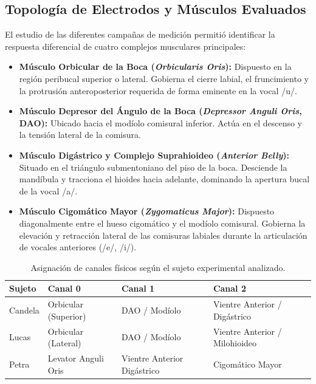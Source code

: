 \documentclass[11pt,a4paper]{article}
\begin{document}
\subsection{Topología de Electrodos y Músculos Evaluados}
\label{subsec:topologia_muscular}

El estudio de las diferentes campañas de medición permitió identificar la respuesta diferencial de cuatro complejos musculares principales:
\begin{itemize}
    \item \textbf{Músculo Orbicular de la Boca (\textit{Orbicularis Oris}):} Dispuesto en la región peribucal superior o lateral. Gobierna el cierre labial, el fruncimiento y la protrusión anteroposterior requerida de forma eminente en la vocal /u/.
    \item \textbf{Músculo Depresor del Ángulo de la Boca (\textit{Depressor Anguli Oris}, DAO):} Ubicado hacia el modíolo comisural inferior. Actúa en el descenso y la tensión lateral de la comisura.
    \item \textbf{Músculo Digástrico y Complejo Suprahioideo (\textit{Anterior Belly}):} Situado en el triángulo submentoniano del piso de la boca. Desciende la mandíbula y tracciona el hioides hacia adelante, dominando la apertura bucal de la vocal /a/.
    \item \textbf{Músculo Cigomático Mayor (\textit{Zygomaticus Major}):} Dispuesto diagonalmente entre el hueso cigomático y el modíolo comisural. Gobierna la elevación y retracción lateral de las comisuras labiales durante la articulación de vocales anteriores (/e/, /i/).
\end{itemize}

\begin{table}[H]
\centering
\small
\begin{tabularx}{\textwidth}{l p{3.5cm} p{3.5cm} X}
\toprule
\textbf{Sujeto} & \textbf{Canal 0} & \textbf{Canal 1} & \textbf{Canal 2} \\
\midrule
Candela & Orbicular (Superior) & DAO / Modíolo & Vientre Anterior / Digástrico \\
Lucas   & Orbicular (Lateral)  & DAO / Modíolo & Vientre Anterior / Milohioideo \\
Petra   & Levator Anguli Oris  & Vientre Anterior Digástrico & Cigomático Mayor \\
\bottomrule
\end{tabularx}
\caption{Asignación de canales físicos según el sujeto experimental analizado.}
\label{tab:canales_sujetos}
\end{table}
\end{document}
